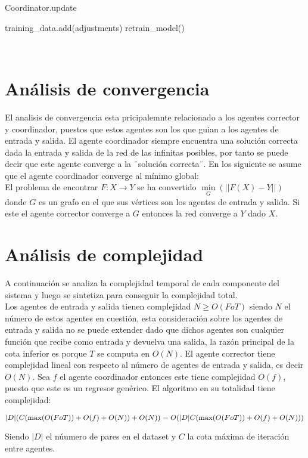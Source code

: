  \begin{algorithm}[H]
 \caption{Coordinator.update}
 training\_data.add(adjustments)\;
 retrain\_model()\;
 \end{algorithm} \\



 \section*{Análisis de convergencia}
 
    El analisis de convergencia esta pricipalemnte relacionado a los agentes corrector y coordinador, puestos que estos agentes son los que guian a los agentes 
    de entrada y salida. El agente coordinador siempre encuentra una solución correcta dada la entrada y salida de la red de las infinitas posibles, por tanto se 
    puede decir que este agente converge a la ¨solución correcta¨. En los siguiente se asume que el agente coordinador converge al mínimo global: \\

    El problema de encontrar $F:X \rightarrow Y$ se ha convertido $\underset{G}{\min}(||F(X)-Y||)$ donde $G$ es un grafo en el que sus vértices son los agentes de entrada y salida. Si 
    este el agente corrector converge a $G$  entonces la red converge a $Y$ dado $X$.


 \section*{Análisis de complejidad}

    A continuación se analiza la complejidad temporal de cada componente del sistema y luego se sintetiza para conseguir la complejidad total. \\

    Los agentes de entrada y salida tienen complejidad $N \geq O(FoT) $ siendo $N$ el número de estos agentes en cuestión, esta consideración 
    sobre los agentes de entrada y salida no se puede extender dado que dichos agentes son cualquier función que recibe como entrada y devuelva una salida, la 
    razón principal de la cota inferior es porque $T$ se computa en $O(N)$. El agente corrector tiene complejidad lineal con respecto al número de agentes 
    de entrada y salida, es decir $O(N)$. Sea $f$ el agente coordinador entonces este tiene complejidad $O(f)$, puesto que este es un regresor genérico. 
    El algoritmo en su totalidad tiene complejidad: 
    \begin{center}
        
        \begin{equation*}
                
                |D|(C( \max(O(F o T )) + O(f) + O(N)) + O(N)) \\
                = O(|D|C( \max(O(F o T )) + O(f) + O(N)))\\

        \end{equation*}

    \end{center}

Siendo $|D|$ el núumero de pares en el dataset y $C$ la cota máxima de iteración entre agentes.
